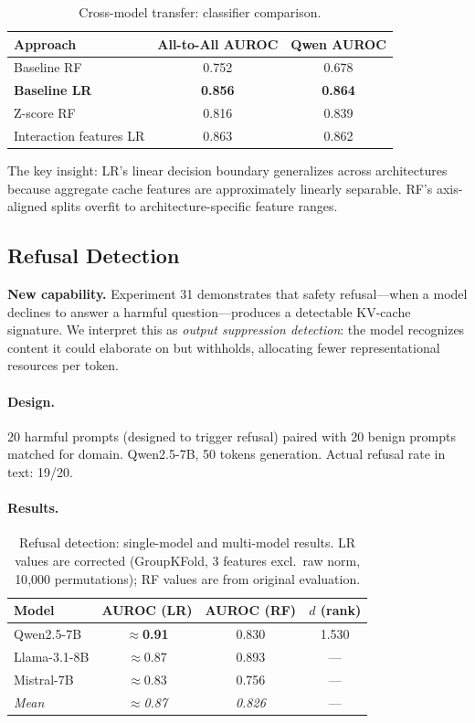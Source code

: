 \begin{table}[H]
\centering
\caption{Cross-model transfer: classifier comparison.}
\label{tab:transfer}
\begin{tabular}{lcc}
\toprule
\textbf{Approach} & \textbf{All-to-All AUROC} & \textbf{Qwen AUROC} \\
\midrule
Baseline RF & 0.752 & 0.678 \\
\textbf{Baseline LR} & \textbf{0.856} & \textbf{0.864} \\
Z-score RF & 0.816 & 0.839 \\
Interaction features LR & 0.863 & 0.862 \\
\bottomrule
\end{tabular}
\end{table}

The key insight: LR's linear decision boundary generalizes across architectures because aggregate cache features are approximately linearly separable. RF's axis-aligned splits overfit to architecture-specific feature ranges.

\subsection{Refusal Detection}
\label{sec:refusal}

\textbf{New capability.} Experiment 31 demonstrates that safety refusal---when a model declines to answer a harmful question---produces a detectable KV-cache signature. We interpret this as \emph{output suppression detection}: the model recognizes content it could elaborate on but withholds, allocating fewer representational resources per token.

\paragraph{Design.} 20 harmful prompts (designed to trigger refusal) paired with 20 benign prompts matched for domain. Qwen2.5-7B, 50 tokens generation. Actual refusal rate in text: 19/20.

\paragraph{Results.}

\begin{table}[H]
\centering
\caption{Refusal detection: single-model and multi-model results. LR values are corrected (GroupKFold, 3 features excl.\ raw norm, 10{,}000 permutations); RF values are from original evaluation.}
\label{tab:refusal}
\begin{tabular}{lccc}
\toprule
\textbf{Model} & \textbf{AUROC (LR)} & \textbf{AUROC (RF)} & \textbf{$d$ (rank)} \\
\midrule
Qwen2.5-7B & $\approx$\textbf{0.91} & 0.830 & 1.530 \\
Llama-3.1-8B & $\approx$0.87 & 0.893 & --- \\
Mistral-7B & $\approx$0.83 & 0.756 & --- \\
\midrule
\textit{Mean} & $\approx$\textit{0.87} & \textit{0.826} & --- \\
\bottomrule
\end{tabular}
\end{table}

